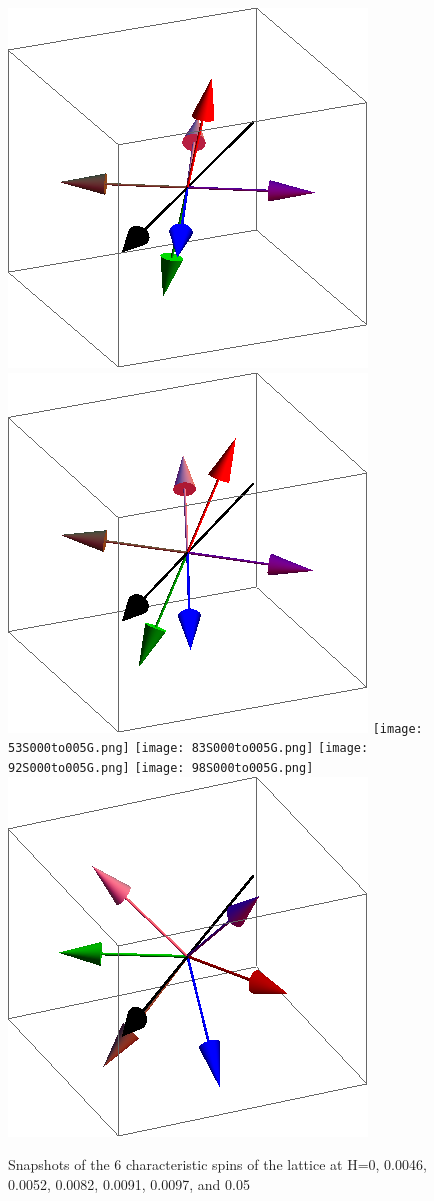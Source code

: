 \documentclass{article}
\begin{document}
\begin{figure}[ht]
\centering
\includegraphics[scale=0.27]{1S000to005G.png}
\includegraphics[scale=0.27]{47S000to005G.png}
\texttt{[image: 53S000to005G.png]}
\texttt{[image: 83S000to005G.png]}
\texttt{[image: 92S000to005G.png]}
\texttt{[image: 98S000to005G.png]}
\includegraphics[scale=0.27]{501S000to005G.png}
\caption{Snapshots of the 6 characteristic spins of the lattice at H=0, 0.0046, 0.0052, 0.0082, 0.0091, 0.0097, and 0.05}
\end{figure}
\end{document}
